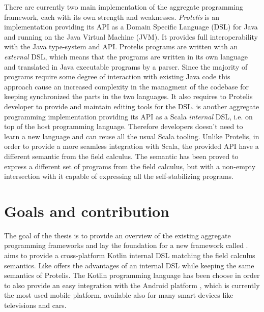 There are currently two main implementation of the aggregate programming framework, each with its own strength and weaknesses. \textit{Protelis} \cite{Protelis} is an implementation providing its API as a Domain Specific Language (DSL) for Java and running on the Java Virtual Machine (JVM). It provides full interoperability with the Java type-system and API. Protelis programs are written with an \textit{external} DSL, which means that the programs are written in its own language and translated in Java executable programs by a parser. Since the majority of programs require some degree of interaction with existing Java code this approach cause an increased complexity in the managment of the codebase for keeping synchronized the parts in the two languages. It also requires to Protelis developer to provide and maintain editing tools for the DSL. \textit{\Scafi{}} \cite{Scafi} is another aggregate programming implementation providing its API as a Scala \cite{Scala} \textit{internal} DSL, i.e. on top of the host programming language. Therefore \Scafi{} developers doesn't need to learn a new language and can reuse all the usual Scala tooling. Unlike Protelis, in order to provide a more seamless integration with Scala, the provided API have a different semantic from the field calculus. The \Scafi{} semantic has been proved to express a different set of programs from the field calculus, but with a non-empty intersection with it capable of expressing all the self-stabilizing programs.

\section{Goals and contribution}
The goal of the thesis is to provide an overview of the  existing aggregate programming frameworks and lay the foundation for a new framework called \textit{\Kotac{}}. \Kotac{} aims to provide a cross-platform Kotlin \cite{Kotlin} internal DSL matching the field calculus semantics. Like \Scafi{} offers the advantages of an internal DSL while keeping the same semantics of Protelis. The Kotlin programming language has been choose in order to also provide an easy integration with the Android platform \cite{Android}, which is currently the most used mobile platform, available also for many smart devices like televisions and cars.

